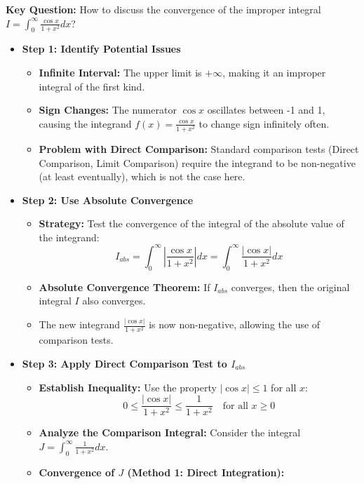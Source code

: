 \begin{cascade}
	\textbf{Key Question:} How to discuss the convergence of the improper integral $I = \int_0^\infty \frac{\cos x}{1+x^2} dx$?
	\begin{itemize}
		\item \textbf{Step 1: Identify Potential Issues}
		      \begin{itemize}
			      \item \textbf{Infinite Interval:} The upper limit is $+\infty$, making it an improper integral of the first kind.
			      \item \textbf{Sign Changes:} The numerator $\cos x$ oscillates between -1 and 1, causing the integrand $f(x) = \frac{\cos x}{1+x^2}$ to change sign infinitely often.
			      \item \textbf{Problem with Direct Comparison:} Standard comparison tests (Direct Comparison, Limit Comparison) require the integrand to be non-negative (at least eventually), which is not the case here.
		      \end{itemize}
		\item \textbf{Step 2: Use Absolute Convergence}
		      \begin{itemize}
			      \item \textbf{Strategy:} Test the convergence of the integral of the absolute value of the integrand:
			            \[ I_{abs} = \int_0^\infty \left| \frac{\cos x}{1+x^2} \right| dx = \int_0^\infty \frac{|\cos x|}{1+x^2} dx \]
			      \item \textbf{Absolute Convergence Theorem:} If $I_{abs}$ converges, then the original integral $I$ also converges.
			      \item The new integrand $\frac{|\cos x|}{1+x^2}$ is now non-negative, allowing the use of comparison tests.
		      \end{itemize}
		\item \textbf{Step 3: Apply Direct Comparison Test to $I_{abs}$}
		      \begin{itemize}
			      \item \textbf{Establish Inequality:} Use the property $|\cos x| \le 1$ for all $x$:
			            \[ 0 \le \frac{|\cos x|}{1+x^2} \le \frac{1}{1+x^2} \quad \text{for all } x \ge 0 \]
			      \item \textbf{Analyze the Comparison Integral:} Consider the integral $J = \int_0^\infty \frac{1}{1+x^2} dx$.
			      \item \textbf{Convergence of $J$ (Method 1: Direct Integration):}

\end{itemize}
\end{itemize}
\end{cascade}
